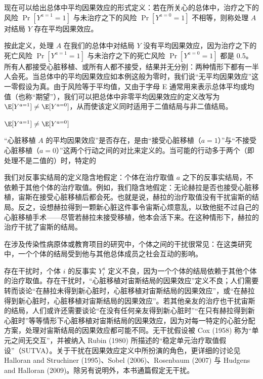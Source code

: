 现在可以给出总体中平均因果效应的形式定义：若在所关心的总体中，治疗之下的风险 $\Pr[Y^{a=1}=1]$ 与未治疗之下的风险 $\Pr[Y^{a=0}=1]$ 不相等，则称处理 $A$ 对结局 $Y$ 存在平均因果效应。

按此定义，处理 $A$ 在我们的总体中对结局 $Y$ 没有平均因果效应，因为治疗之下的死亡风险 $\Pr[Y^{a=1}=1]$ 与未治疗之下的死亡风险 $\Pr[Y^{a=0}=1]$ 都是 0.5。所有人都接受心脏移植、或所有人都不接受，结果并无分别：两种情形下都有一半人会死。当总体中的平均因果效应如本例这般为零时，我们说“无平均因果效应”这一零假设为真。由于风险等于平均值，又由于字母 E 通常用来表示总体平均或均值（也称“期望”），我们可以把总体中非零平均因果效应的定义改写为 $\E[Y^{a=1}]\neq\E[Y^{a=0}]$，从而使该定义同时适用于二值结局与非二值结局。

\begin{defbox}[总体中的平均因果效应]
$\E[Y^{a=1}]\neq\E[Y^{a=0}]$
\end{defbox}

“心脏移植 $A$ 的平均因果效应”是否存在，是由“接受心脏移植（$a=1$）”与“不接受心脏移植（$a=0$）”这两个行动之间的对比来定义的。当可能的行动多于两个（即处理不是二值的）时，特定的

\renewcommand{\FPname}{精要（Fine Point）}
\begin{finepoint}[干扰]
我们对反事实结局的定义隐含地假定：个体在治疗取值 $a$ 之下的反事实结局，不依赖于其他个体的治疗取值。例如，我们隐含地假定：无论赫拉是否也接受心脏移植，宙斯在接受心脏移植后都会死。也就是说，赫拉的治疗取值没有干扰宙斯的结局。反之，设想赫拉得到一颗新心脏这件事令宙斯心烦意乱，以致他挺不过自己的心脏移植手术——尽管若赫拉未接受移植，他本会活下来。在这种情形下，赫拉的治疗干扰了宙斯的结局。

在涉及传染性病原体或教育项目的研究中，个体之间的干扰很常见：在这类研究中，一个个体的结局受到他与其他总体成员之社会互动的影响。

存在干扰时，个体 $i$ 的反事实 $Y_i^{a}$ 定义不良，因为一个个体的结局依赖于其他个体的治疗取值。存在干扰时，“心脏移植对宙斯结局的因果效应”定义不良；人们需要转而谈论“在赫拉未得到新心脏时，心脏移植对宙斯结局的因果效应”，或“在赫拉得到新心脏时，心脏移植对宙斯结局的因果效应”。若其他亲友的治疗也干扰宙斯的结局，人们或许还需要谈论“在没有任何亲友得到新心脏时”“在只有赫拉得到新心脏时”等等情形下心脏移植对宙斯结局的因果效应，因为对每一特定的心脏分配方案，处理对宙斯结局的因果效应都可能不同。无干扰假设被 Cox (1958) 称为“单元之间无交互”，并被纳入 Rubin (1980) 所描述的“稳定单元治疗取值假设”（SUTVA）。关于干扰在因果效应定义中所扮演的角色，更详细的讨论见 Halloran and Struchiner (1995)、Sobel (2006)、Rosenbaum (2007) 与 Hudgens and Halloran (2009)。除另有说明外，本书通篇假定无干扰。
\end{finepoint}
\renewcommand{\FPname}{精要}

